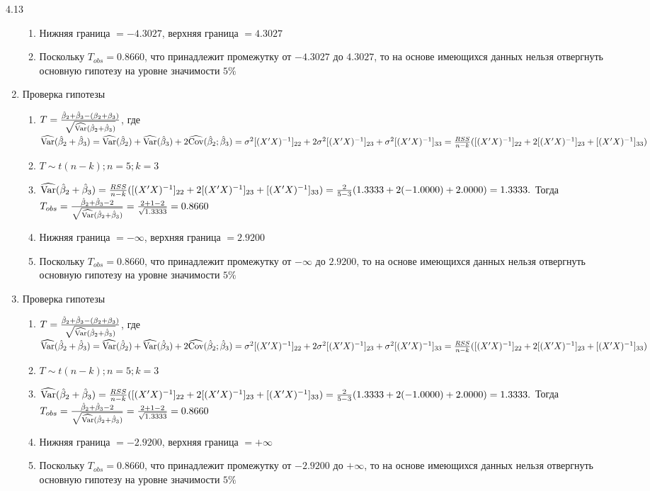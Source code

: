 \begin{solution}{{4.13}}
\begin{enumerate}
\begin{enumerate}
\item Нижняя граница $= - 4.3027$, верхняя граница $= 4.3027$
\item Поскольку $T_{obs} = 0.8660$, что принадлежит промежутку от $- 4.3027$ до $4.3027$, то на основе имеющихся данных нельзя отвергнуть основную гипотезу на уровне значимости $5\%$
\end{enumerate}
\item Проверка гипотезы
\begin{enumerate}
\item $T = \frac{\hat{\beta}_2 + \hat{\beta}_3 - (\beta_2 + \beta_3)}{\sqrt{\widehat{\operatorname{Var}}(\hat{\beta}_2 + \hat{\beta}_3)}}$, где $\widehat{\operatorname{Var}}(\hat{\beta}_2 + \hat{\beta}_3) = \widehat{\operatorname{Var}}(\hat{\beta}_2) + \widehat{\operatorname{Var}}(\hat{\beta}_3) + 2\widehat{\operatorname{Cov}}(\hat{\beta}_2;\hat{\beta}_3) = \sigma^2 [(X'X)^{-1}]_{22} + 2\sigma^2 [(X'X)^{-1}]_{23} + \sigma^2 [(X'X)^{-1}]_{33}= \frac{RSS}{n - k}([(X'X)^{-1}]_{22} + 2[(X'X)^{-1}]_{23} + [(X'X)^{-1}]_{33})$
\item $T \sim t(n-k); n = 5; k = 3$
\item $\widehat{\operatorname{Var}}(\hat{\beta}_2 + \hat{\beta}_3) = \frac{RSS}{n - k}([(X'X)^{-1}]_{22} + 2[(X'X)^{-1}]_{23} + [(X'X)^{-1}]_{33}) = \frac{2}{5 - 3} (1.3333 + 2(-1.0000) + 2.0000) = 1.3333.$ Тогда $T_{obs} = \frac{\hat{\beta}_2 + \hat{\beta}_3 - 2}{\sqrt{\widehat{\operatorname{Var}}(\hat{\beta}_2 + \hat{\beta}_3)}} = \frac{2 + 1 - 2}{\sqrt{1.3333}} = 0.8660$
\item Нижняя граница $= - \infty$, верхняя граница $= 2.9200$
\item Поскольку $T_{obs} = 0.8660$, что принадлежит промежутку от $- \infty$ до $2.9200$, то на основе имеющихся данных нельзя отвергнуть основную гипотезу на уровне значимости $5\%$
\end{enumerate}
\item Проверка гипотезы
\begin{enumerate}
\item $T = \frac{\hat{\beta}_2 + \hat{\beta}_3 - (\beta_2 + \beta_3)}{\sqrt{\widehat{\operatorname{Var}}(\hat{\beta}_2 + \hat{\beta}_3)}}$, где $\widehat{\operatorname{Var}}(\hat{\beta}_2 + \hat{\beta}_3) = \widehat{\operatorname{Var}}(\hat{\beta}_2) + \widehat{\operatorname{Var}}(\hat{\beta}_3) + 2\widehat{\operatorname{Cov}}(\hat{\beta}_2;\hat{\beta}_3) = \sigma^2 [(X'X)^{-1}]_{22} + 2\sigma^2 [(X'X)^{-1}]_{23} + \sigma^2 [(X'X)^{-1}]_{33}= \frac{RSS}{n - k}([(X'X)^{-1}]_{22} + 2[(X'X)^{-1}]_{23} + [(X'X)^{-1}]_{33})$
\item $T \sim t(n-k); n = 5; k = 3$
\item $\widehat{\operatorname{Var}}(\hat{\beta}_2 + \hat{\beta}_3) = \frac{RSS}{n - k}([(X'X)^{-1}]_{22} + 2[(X'X)^{-1}]_{23} + [(X'X)^{-1}]_{33}) = \frac{2}{5 - 3} (1.3333 + 2(-1.0000) + 2.0000) = 1.3333.$ Тогда $T_{obs} = \frac{\hat{\beta}_2 + \hat{\beta}_3 - 2}{\sqrt{\widehat{\operatorname{Var}}(\hat{\beta}_2 + \hat{\beta}_3)}} = \frac{2 + 1 - 2}{\sqrt{1.3333}} = 0.8660$
\item Нижняя граница $= - 2.9200$, верхняя граница $= + \infty$
\item Поскольку $T_{obs} = 0.8660$, что принадлежит промежутку от $-  2.9200$ до $+ \infty$, то на основе имеющихся данных нельзя отвергнуть основную гипотезу на уровне значимости $5\%$
\end{enumerate}
\end{enumerate}
\end{solution}
